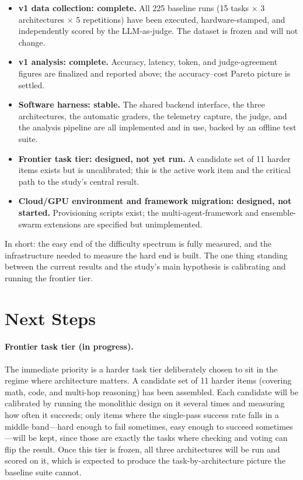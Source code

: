 \documentclass[sigconf,nonacm]{acmart}
\begin{document}
\begin{itemize}
  \item \textbf{v1 data collection: complete.} All 225 baseline runs
        (15 tasks $\times$ 3 architectures $\times$ 5 repetitions) have been
        executed, hardware-stamped, and independently scored by the
        LLM-as-judge. The dataset is frozen and will not change.
  \item \textbf{v1 analysis: complete.} Accuracy, latency, token, and
        judge-agreement figures are finalized and reported above; the
        accuracy--cost Pareto picture is settled.
  \item \textbf{Software harness: stable.} The shared backend interface, the
        three architectures, the automatic graders, the telemetry capture, the
        judge, and the analysis pipeline are all implemented and in use, backed
        by an offline test suite.
  \item \textbf{Frontier task tier: designed, not yet run.} A candidate set of
        11 harder items exists but is uncalibrated; this is the active work
        item and the critical path to the study's central result.
  \item \textbf{Cloud/GPU environment and framework migration: designed, not
        started.} Provisioning scripts exist; the multi-agent-framework and
        ensemble-swarm extensions are specified but unimplemented.
\end{itemize}

\noindent In short: the easy end of the difficulty spectrum is fully measured,
and the infrastructure needed to measure the hard end is built. The one thing
standing between the current results and the study's main hypothesis is
calibrating and running the frontier tier.

\section{Next Steps}
\label{sec:next}

\paragraph{Frontier task tier (in progress).} The immediate priority is a harder
task tier deliberately chosen to sit in the regime where architecture matters. A
candidate set of 11 harder items (covering math, code, and multi-hop reasoning)
has been assembled. Each candidate will be calibrated by running the monolithic
design on it several times and measuring how often it succeeds; only items where
the single-pass success rate falls in a middle band---hard enough to fail
sometimes, easy enough to succeed sometimes---will be kept, since those are
exactly the tasks where checking and voting can flip the result. Once this tier is
frozen, all three architectures will be run and scored on it, which is expected to
produce the task-by-architecture picture the baseline suite cannot.
\end{document}
